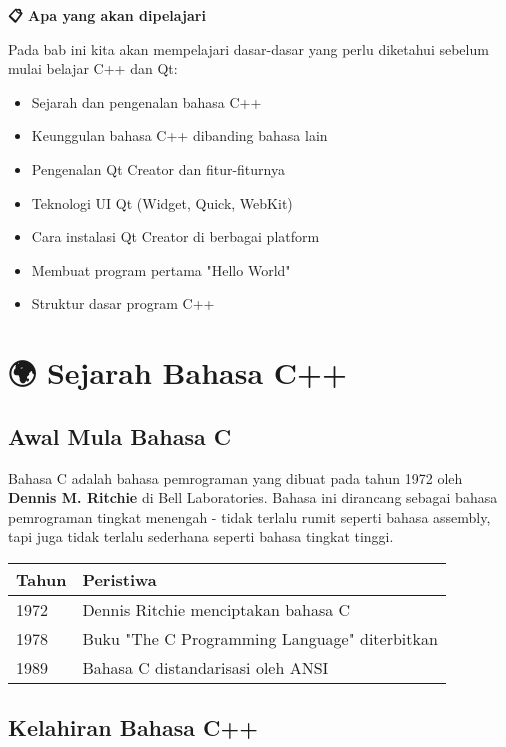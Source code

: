 \textbf{📋 Apa yang akan dipelajari}

Pada bab ini kita akan mempelajari dasar-dasar yang perlu diketahui sebelum mulai belajar C++ dan Qt:

\begin{itemize}
\item Sejarah dan pengenalan bahasa C++
\item Keunggulan bahasa C++ dibanding bahasa lain
\item Pengenalan Qt Creator dan fitur-fiturnya
\item Teknologi UI Qt (Widget, Quick, WebKit)
\item Cara instalasi Qt Creator di berbagai platform
\item Membuat program pertama "Hello World"
\item Struktur dasar program C++
\end{itemize}

\minitoc

\section{🌍 Sejarah Bahasa C++}

\subsection{Awal Mula Bahasa C}

Bahasa C adalah bahasa pemrograman yang dibuat pada tahun 1972 oleh \textbf{Dennis M. Ritchie} di Bell Laboratories. Bahasa ini dirancang sebagai bahasa pemrograman tingkat menengah - tidak terlalu rumit seperti bahasa assembly, tapi juga tidak terlalu sederhana seperti bahasa tingkat tinggi.

\begin{center}
\begin{tabular}{|l|l|}
\hline
\textbf{Tahun} & \textbf{Peristiwa} \\
\hline
1972 & Dennis Ritchie menciptakan bahasa C \\
\hline
1978 & Buku "The C Programming Language" diterbitkan \\
\hline
1989 & Bahasa C distandarisasi oleh ANSI \\
\hline
\end{tabular}
\end{center}

\subsection{Kelahiran Bahasa C++}

